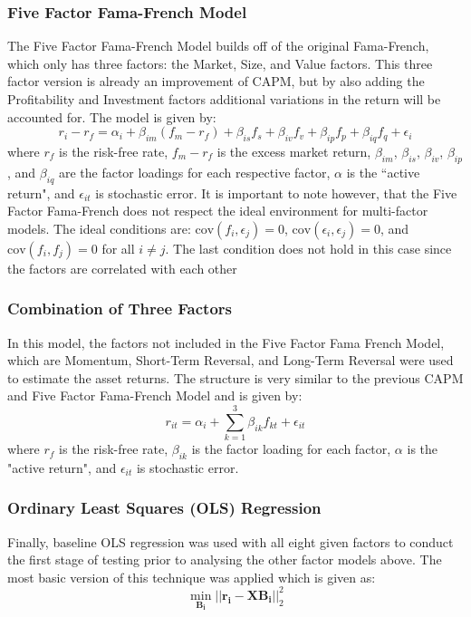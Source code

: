\documentclass[10pt]{article}
\begin{document}
\subsubsection{Five Factor Fama-French Model}
\label{sec:ffff}
The Five Factor Fama-French Model builds off of the original Fama-French, which only has three   factors: the Market, Size, and Value factors. This three factor version is already an improvement of CAPM, but by also adding the Profitability and Investment factors additional variations in the return will be accounted for.  The model is given by: 
$$ r_i - r_f = \alpha_i + \beta_{im} (f_m-r_f) + \beta_{is} f_s + \beta_{iv}f_v + \beta_{ip}f_p + \beta_{iq}f_q + \epsilon_i $$
where $r_f$ is the risk-free rate, $f_m-r_f$ is the excess market return, $\beta_{im}$,  $\beta_{is}$, $\beta_{iv}$, $\beta_{ip}$, and $\beta_{iq}$ are the factor loadings for each respective factor, $\alpha$ is the ``active return", and $\epsilon_{it}$ is stochastic error. It is important to note however, that the Five Factor Fama-French does not respect the ideal environment for multi-factor models. The ideal conditions are: $\text{cov}(f_i, \epsilon_j) = 0$, $\text{cov}(\epsilon_i, \epsilon_j) = 0$, and $\text{cov}(f_i, f_j) = 0$ for all $i \neq j$. The last condition does not hold in this case since the factors are correlated with each other
\subsubsection{Combination of Three Factors}
\label{sec:three}
In this model, the factors not included in the Five Factor Fama French Model, which are Momentum, Short-Term Reversal, and Long-Term Reversal were used to estimate the asset returns. The structure is very similar to the previous CAPM and Five Factor Fama-French Model and is given by:
$$ r_{it} = \alpha_i + \sum_{k=1}^3 \beta_{ik}f_{kt} + \epsilon_{it}$$
where $r_f$ is the risk-free rate,  $\beta_{ik}$ is the factor loading for each factor, $\alpha$ is the "active return", and $\epsilon_{it}$ is stochastic error.
\subsubsection{Ordinary Least Squares (OLS) Regression}
\label{sec:ols}
Finally, baseline OLS regression was used with all eight given factors to conduct the first stage of testing prior to analysing the other factor models above.  The most basic version of this technique was applied which is given as: 
$$ \min_{\bm{B_i}}     || \bm{r_i - XB_i}||_2^2 $$
\end{document}
